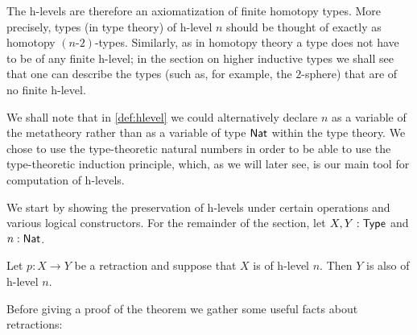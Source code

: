 The h-levels are therefore an axiomatization of finite homotopy types.
More precisely, types (in type theory) of h-level $n$ should be thought of exactly as homotopy $(n\mbox{-}2)$-types.
Similarly, as in homotopy theory a type does not have to be of any finite h-level;
in the section on higher inductive types we shall see that one can describe the types (such as, for example, the $2$-sphere)
that are of no finite h-level.

\begin{rmk}
 We shall note that in \autoref{def:hlevel} we could alternatively declare $n$ as a variable of the metatheory rather than 
 as a variable of type $\mathsf{Nat}$ within the type theory.
 We chose to use the type-theoretic natural numbers in order to be able to use the type-theoretic induction principle, which, as we 
 will later see, is our main tool for computation of h-levels.
\end{rmk}


We start by showing the preservation of h-levels under certain operations and various logical constructors.
For the remainder of the section, let $X, Y : \mathsf{Type}$ and $n : \mathsf{Nat}$.
\begin{thm}\label{thm:h-level-retracts}
 Let $p \colon X \to Y$ be a retraction and suppose that $X$ is of h-level $n$. Then $Y$ is also of h-level $n$.
\end{thm}

Before giving a proof of the theorem we gather some useful facts about retractions:

